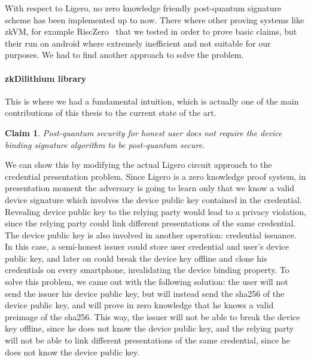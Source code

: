 \documentclass[binding=0.6cm,oneside,noexaminfo]{sapthesis}
\newtheorem{claim}{Claim}
\begin{document}
With respect to Ligero, no zero knowledge friendly post-quantum signature scheme has been implemented up to now.
There where other proving systems like zkVM, for example RiscZero~\cite{RiscZero2026} that we tested in order to prove basic claims, but their
run on android where extremely inefficient and not suitable for our purposes. We had to find another approach to solve the problem.

\paragraph{zkDilithium library}
This is where we had a fundamental intuition, which is actually one of the main contributions of this thesis to the current
state of the art. 
\begin{claim}
Post-quantum security for honest user does not require the device binding signature algorithm to be post-quantum secure.
\end{claim}
We can show this by modifying the actual Ligero circuit approach to the credential presentation problem.
Since Ligero is a zero knowledge proof system, in presentation moment the adversary is going to learn only that we know a valid
device signature which involves the device public key contained in the credential. Revealing device public key to the relying party
would lead to a privacy violation, since the relying party could link different presentations of the same credential.
The device public key is also involved in another operation: credential issuance. 
In this case, a semi-honest issuer could store user credential and user's device public key, and later on could break the device key
offline and clone his credentials on every smartphone, invalidating the device binding property.
To solve this problem, we came out with the following solution: the user will not send the issuer his device public key, 
but will instead send the sha256 of the device public key, and will prove in zero knowledge that he knows a valid preimage of the 
sha256. This way, the issuer will not be able to break the device key offline, since he does not know the device public key,
and the relying party will not be able to link different presentations of the same credential, since he does not know the device public key.
\end{document}
